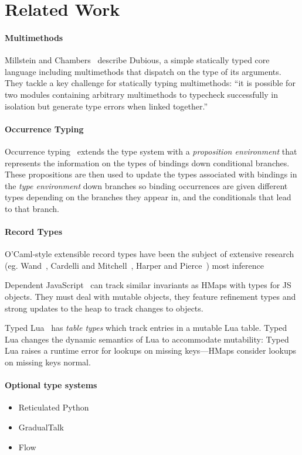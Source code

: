 \section{Related Work}

\paragraph{Multimethods} 
Millstein and Chambers~\cite{MS02}
describe Dubious, a simple statically typed core language including multimethods that
dispatch on the type of its arguments. They tackle a key challenge for statically typing
multimethods: ``it is possible for two modules containing arbitrary multimethods to typecheck
successfully in isolation but generate type errors when linked together.''~\cite{MS02}

\paragraph{Occurrence Typing} 
Occurrence typing~\cite{TF08,TF10} extends the type 
system with a \emph{proposition environment} that represents 
the information on the types of bindings down conditional branches.
These propositions are then used to update the types associated
with bindings in the \emph{type environment} down branches
so binding occurrences are given different types 
depending on the branches they appear in, and the conditionals
that lead to that branch.


\paragraph{Record Types} 
O'Caml-style extensible record types have been the subject of extensive research 
(eg. Wand~\cite{Wan89}, Cardelli and Mitchell~\cite{CM91}, Harper and Pierce~\cite{HP91})
most inference


Dependent JavaScript~\cite{Chugh:2012:DTJ} can track similar invariants as HMaps with types
for JS objects. They must deal with mutable objects, they feature refinement types and strong updates to the heap
to track changes to objects.

Typed Lua~\cite{Maidl:2014:TLO} has \emph{table types} which track entries in a mutable Lua table.
Typed Lua changes the dynamic semantics of Lua to accommodate mutability: Typed Lua raises a runtime error
for lookups on missing keys---HMaps consider lookups on missing keys normal.


\paragraph{Optional type systems}
\begin{itemize}
  \item Reticulated Python~\cite{Vitousek14}
  \item GradualTalk
  \item Flow
\end{itemize}

